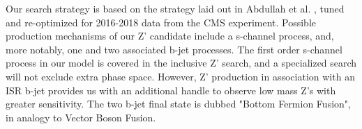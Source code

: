 \documentclass[11pt]{article}
\begin{document}
Our search strategy is based on the strategy laid out in Abdullah et al. \cite{PhysRevD.97.075035}, tuned and re-optimized for 2016-2018 data from the CMS experiment. Possible production mechanisms of our Z' candidate include a s-channel process, and, more notably, one and two associated b-jet processes. The first order s-channel process in our model is covered in the inclusive Z' search, and a specialized search will not exclude extra phase space. However, Z' production in association with an ISR b-jet provides us with an additional handle to observe low mass Z's with greater sensitivity. The two b-jet final state is dubbed "Bottom Fermion Fusion", in analogy to Vector Boson Fusion. 




    \label{fig:ABCD_eqn}


\end{document}
